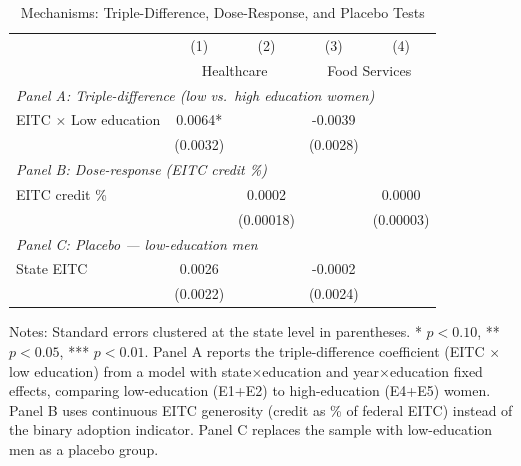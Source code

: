 \begin{table}[H]
\centering
\caption{Mechanisms: Triple-Difference, Dose-Response, and Placebo Tests}
\label{tab:mechanisms}
\begin{threeparttable}
\begin{tabular}{lcccc}
\toprule
& (1) & (2) & (3) & (4) \\
& \multicolumn{2}{c}{Healthcare} & \multicolumn{2}{c}{Food Services} \\
\midrule
\multicolumn{5}{l}{\textit{Panel A: Triple-difference (low vs.\ high education women)}} \\[3pt]
EITC $\times$ Low education & 0.0064* & & -0.0039 & \\
& (0.0032) & & (0.0028) & \\[6pt]
\multicolumn{5}{l}{\textit{Panel B: Dose-response (EITC credit \%)}} \\[3pt]
EITC credit \% & & 0.0002 & & 0.0000 \\
& & (0.00018) & & (0.00003) \\[6pt]
\multicolumn{5}{l}{\textit{Panel C: Placebo --- low-education men}} \\[3pt]
State EITC & 0.0026 & & -0.0002 & \\
& (0.0022) & & (0.0024) & \\
\bottomrule
\end{tabular}
\begin{tablenotes}[flushleft]
\small
\item Notes: Standard errors clustered at the state level in parentheses. * $p<0.10$, ** $p<0.05$, *** $p<0.01$. Panel A reports the triple-difference coefficient (EITC $\times$ low education) from a model with state$\times$education and year$\times$education fixed effects, comparing low-education (E1+E2) to high-education (E4+E5) women. Panel B uses continuous EITC generosity (credit as \% of federal EITC) instead of the binary adoption indicator. Panel C replaces the sample with low-education men as a placebo group.
\end{tablenotes}
\end{threeparttable}
\end{table}
